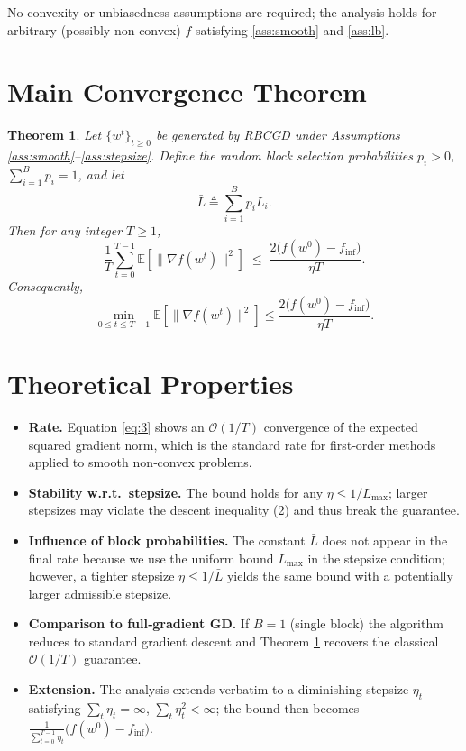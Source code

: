 \documentclass{article}
\newtheorem{theorem}{Theorem}
\newcommand{\E}{\mathbb{E}}
\begin{document}
No convexity or unbiasedness assumptions are required; the analysis
holds for arbitrary (possibly non‑convex) $f$ satisfying \ref{ass:smooth} and \ref{ass:lb}.

\section*{Main Convergence Theorem}
\begin{theorem}\label{thm:main}
Let $\{w^{t}\}_{t\ge0}$ be generated by RBCGD under Assumptions
\ref{ass:smooth}--\ref{ass:stepsize}.  Define the random block
selection probabilities $p_{i}>0$, $\sum_{i=1}^{B}p_{i}=1$, and let
\[
\bar L \triangleq \sum_{i=1}^{B}p_{i}L_{i}.
\]
Then for any integer $T\ge1$,
\[
\frac{1}{T}\sum_{t=0}^{T-1}\E\!\left[
\|\nabla f(w^{t})\|^{2}\right]
\;\le\;
\frac{2\bigl(f(w^{0})-f_{\inf}\bigr)}{\eta T}.
\tag{3}
\]
Consequently,
\[
\min_{0\le t\le T-1}\E\!\left[
\|\nabla f(w^{t})\|^{2}\right]
\le
\frac{2\bigl(f(w^{0})-f_{\inf}\bigr)}{\eta T}.
\]
\end{theorem}

\section*{Theoretical Properties}
\begin{itemize}
\item \textbf{Rate.} Equation \eqref{eq:3} shows an $\mathcal{O}(1/T)$
convergence of the expected squared gradient norm, which is the standard
rate for first‑order methods applied to smooth non‑convex problems.
\item \textbf{Stability w.r.t.\ stepsize.} The bound holds for any
$\eta\le 1/L_{\max}$; larger stepsizes may violate the descent
inequality (2) and thus break the guarantee.
\item \textbf{Influence of block probabilities.} The constant $\bar L$ does
not appear in the final rate because we use the uniform bound
$L_{\max}$ in the stepsize condition; however, a tighter stepsize
$\eta\le 1/\bar L$ yields the same bound with a potentially larger admissible
stepsize.
\item \textbf{Comparison to full‑gradient GD.} If $B=1$ (single block) the
algorithm reduces to standard gradient descent and Theorem \ref{thm:main}
recovers the classical $\mathcal{O}(1/T)$ guarantee.
\item \textbf{Extension.} The analysis extends verbatim to a diminishing
stepsize $\eta_{t}$ satisfying $\sum_{t}\eta_{t}=\infty$,
$\sum_{t}\eta_{t}^{2}<\infty$; the bound then becomes
$\frac{1}{\sum_{t=0}^{T-1}\eta_{t}}\bigl(f(w^{0})-f_{\inf}\bigr)$.
\end{itemize}
\end{document}
